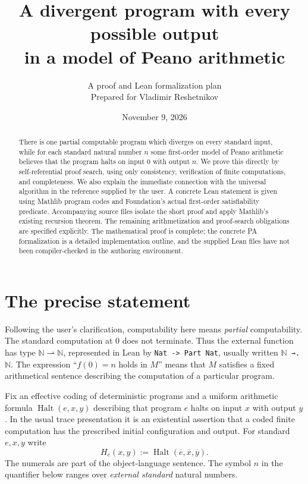 \documentclass[11pt]{article}
\title{A divergent program with every possible output\\in a model of Peano arithmetic}
\author{A proof and Lean formalization plan\\Prepared for Vladimir Reshetnikov}
\date{November 9, 2026}
\newcommand{\N}{\mathbb N}
\newcommand{\Halt}{\operatorname{Halt}}
\newcommand{\num}[1]{\overline{#1}}
\newcommand{\pto}{\rightharpoonup}
\theoremstyle{definition}
\theoremstyle{remark}
\begin{document}
\maketitle
\begin{abstract}
There is one partial computable program which diverges on every standard
input, while for each standard natural number $n$ some first-order model of
Peano arithmetic believes that the program halts on input $0$ with output
$n$. We prove this directly by self-referential proof search, using only
consistency, verification of finite computations, and completeness. We
also explain the immediate connection with the universal algorithm in the
reference supplied by the user. A concrete Lean statement is given using
Mathlib program codes and Foundation's actual first-order satisfiability
predicate. Accompanying source files isolate the short proof and apply
Mathlib's existing recursion theorem. The remaining arithmetization and
proof-search obligations are specified explicitly. The mathematical proof
is complete; the concrete PA formalization is a detailed implementation
outline, and the supplied Lean files have not been compiler-checked in the
authoring environment.
\end{abstract}

\tableofcontents

\section{The precise statement}

Following the user's clarification, computability here means
\emph{partial} computability. The standard computation at $0$ does not
terminate. Thus the external function has type $\N\pto\N$, represented in
Lean by \texttt{Nat -> Part Nat}, usually written \texttt{\ensuremath{\N} →. \ensuremath{\N}}.
The expression ``$f(0)=n$ holds in $M$'' means that $M$ satisfies a fixed
arithmetical sentence describing the computation of a particular program.

Fix an effective coding of deterministic programs and a uniform arithmetic
formula $\Halt(e,x,y)$ describing that program $e$ halts on input $x$ with
output $y$. In the usual trace presentation it is an existential assertion
that a coded finite computation has the prescribed initial configuration
and output. For standard $e,x,y$ write
\[
 H_e(x,y):=\Halt(\num e,\num x,\num y).
\]
The numerals are part of the object-language sentence. The symbol $n$ in
the quantifier below ranges over \emph{external standard} natural numbers.
\end{document}
